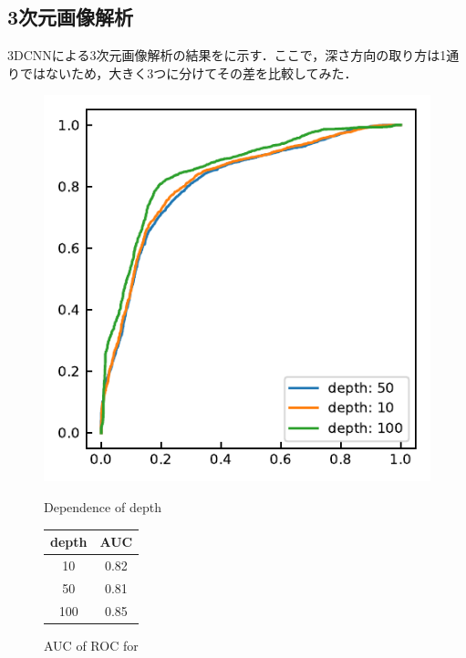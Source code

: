 \subsection{3次元画像解析}
3DCNNによる3次元画像解析の結果をに示す．ここで，深さ方向の取り方は1通りではないため，大きく3つに分けてその差を比較してみた．

\begin{figure}[H]
	\centering
	\begin{minipage}{0.4\columnwidth}
		\centering
		\includegraphics[width=\linewidth]{fig/chapter4/3d/roc/depth_all.pdf}
		\caption{Dependence of depth}
		\label{fig:depthall}
	\end{minipage}
	\makeatletter
	\def\@captype{table}
	\makeatother
	\begin{minipage}{0.4\columnwidth}
		\centering
		\caption{AUC of ROC for }
		\label{tab:2DCNNpreprocessing_AUC}
		\begin{tabular}{cc}\toprule
			depth & AUC \\ \midrule
			10 & 0.82 \\ 
			50 & 0.81 \\ 
			100 & 0.85 \\ \bottomrule
		\end{tabular} 
	\end{minipage}
\end{figure}

